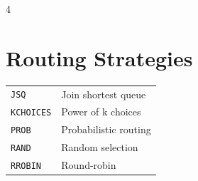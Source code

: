 \documentclass[9pt,landscape,a4paper]{extarticle}
\begin{document}
\begin{multicols}{4}
\section*{Routing Strategies}
\begin{tabular}{@{}ll@{}}
\texttt{JSQ} & Join shortest queue \\
\texttt{KCHOICES} & Power of k choices \\
\texttt{PROB} & Probabilistic routing \\
\texttt{RAND} & Random selection \\
\texttt{RROBIN} & Round-robin \\
\end{tabular}

\end{multicols}

%
%
\end{document}
